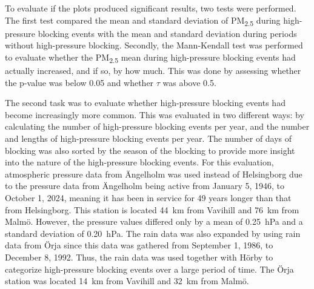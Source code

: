To evaluate if the plots produced significant results, two tests were performed. The first test compared the mean and standard deviation of PM\textsubscript{2.5} during high-pressure blocking events with the mean and standard deviation during periods without high-pressure blocking. Secondly, the Mann-Kendall test was performed to evaluate whether the PM\textsubscript{2.5} mean during high-pressure blocking events had actually increased, and if so, by how much. This was done by assessing whether the p-value was below 0.05 and whether $\tau$ was above 0.5.

The second task was to evaluate whether high-pressure blocking events had become increasingly more common. This was evaluated in two different ways: by calculating the number of high-pressure blocking events per year, and the number and lengths of high-pressure blocking events per year. The number of days of blocking was also sorted by the season of the blocking to provide more insight into the nature of the high-pressure blocking events. For this evaluation, atmospheric pressure data from Ängelholm was used instead of Helsingborg due to the pressure data from Ängelholm being active from January 5, 1946, to October 1, 2024, meaning it has been in service for 49 years longer than that from Helsingborg. This station is located \SI{44}{\km} from Vavihill and \SI{76}{\km} from Malmö. However, the pressure values differed only by a mean of \SI{0.25}{\hecto\pascal} and a standard deviation of \SI{0.20}{\hecto\pascal}. The rain data was also expanded by using rain data from Örja since this data was gathered from September 1, 1986, to December 8, 1992. Thus, the rain data was used together with Hörby to categorize high-pressure blocking events over a large period of time. The Örja station was located \SI{14}{\km} from Vavihill and \SI{32}{\km} from Malmö.


